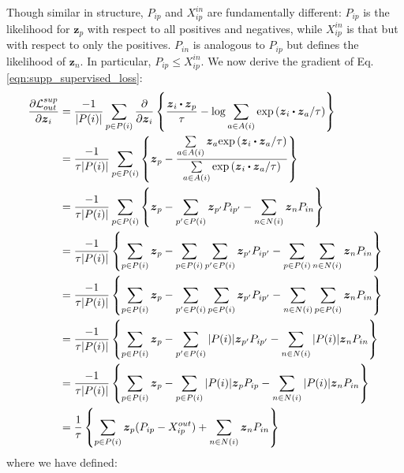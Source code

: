 Though similar in structure, $P_{ip}$ and $X_{ip}^{in}$ are fundamentally different: $P_{ip}$ is the likelihood for $\boldsymbol{z}_p$ with respect to all positives and negatives, while $X_{ip}^{in}$ is that but with respect to only the positives. $P_{in}$ is analogous to $P_{ip}$ but defines the likelihood of $\boldsymbol{z}_n$. In particular, $P_{ip}\le X_{ip}^{in}$. We now derive the gradient of Eq. \ref{eqn:supp_supervised_loss}:
\begin{align}
  \frac{\partial\mathcal{L}_{out}^{sup}}{\partial\boldsymbol{z}_i} & = \frac{-1}{|P(i)|}\sum_{p\in P(i)}\frac{\partial}{\partial\boldsymbol{z}_i}\left\{\frac{\boldsymbol{z}_i\bigcdot\boldsymbol{z}_p}{\tau}-\log\sum\limits_{a\in A(i)}\text{exp}\left(\boldsymbol{z}_i\bigcdot\boldsymbol{z}_a/\tau\right)\right\}\nonumber\\
  & = \frac{-1}{\tau|P(i)|}\sum_{p\in P(i)}\left\{\boldsymbol{z}_p-\frac{\sum\limits_{a\in A(i)}\boldsymbol{z}_a\text{exp}\left(\boldsymbol{z}_i\bigcdot\boldsymbol{z}_a/\tau\right)}{\sum\limits_{a\in A(i)}\text{exp}\left(\boldsymbol{z}_i\bigcdot\boldsymbol{z}_a/\tau\right)}\right\}\nonumber\\
  & = \frac{-1}{\tau|P(i)|}\sum_{p\in P(i)}\left\{\boldsymbol{z}_p-\sum\limits_{p'\in P(i)}\boldsymbol{z}_{p'}P_{ip'}-\sum\limits_{n\in N(i)}\boldsymbol{z}_nP_{in}\right\}\nonumber\\
  & = \frac{-1}{\tau|P(i)|}\left\{\sum_{p\in P(i)}\boldsymbol{z}_p-\sum_{p\in P(i)}\sum\limits_{p'\in P(i)}\boldsymbol{z}_{p'}P_{ip'}-\sum_{p\in P(i)}\sum\limits_{n\in N(i)}\boldsymbol{z}_nP_{in}\right\}\nonumber\\
  & = \frac{-1}{\tau|P(i)|}\left\{\sum_{p\in P(i)}\boldsymbol{z}_p-\sum_{p'\in P(i)}\sum\limits_{p\in P(i)}\boldsymbol{z}_{p'}P_{ip'}-\sum_{n\in N(i)}\sum\limits_{p\in P(i)}\boldsymbol{z}_nP_{in}\right\}\nonumber\\
  & = \frac{-1}{\tau|P(i)|}\left\{\sum_{p\in P(i)}\boldsymbol{z}_p-\sum_{p'\in P(i)}|P(i)|\boldsymbol{z}_{p'}P_{ip'}-\sum_{n\in N(i)}|P(i)|\boldsymbol{z}_nP_{in}\right\}\nonumber\\
  & = \frac{-1}{\tau|P(i)|}\left\{\sum_{p\in P(i)}\boldsymbol{z}_p-\sum_{p\in P(i)}|P(i)|\boldsymbol{z}_pP_{ip}-\sum_{n\in N(i)}|P(i)|\boldsymbol{z}_nP_{in}\right\}\nonumber\\
  & = \frac{1}{\tau}\left\{\sum_{p\in P(i)}\boldsymbol{z}_p(P_{ip}-X_{ip}^{out})+\sum_{n\in N(i)}\boldsymbol{z}_nP_{in}\right\}
  \label{eqn:supp_supervised_loss_gradient}
\end{align}
where we have defined:
